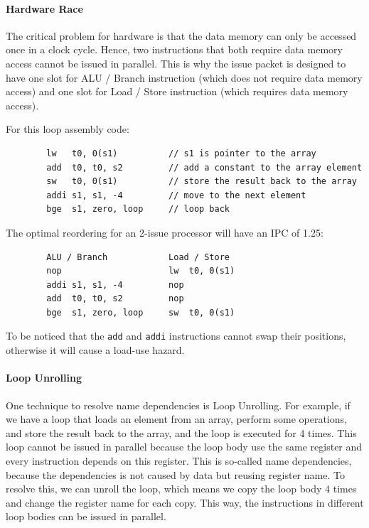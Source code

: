 \documentclass[a4paper,12pt]{article}
\begin{document}
\paragraph{Hardware Race} The critical problem for hardware is that the data memory can only be accessed once in a clock cycle. Hence, two instructions that both require data memory access cannot be issued in parallel. This is why the issue packet is designed to have one slot for ALU / Branch instruction (which does not require data memory access) and one slot for Load / Store instruction (which requires data memory access).  

\begin{examplebox}
	For this loop assembly code:
	\begin{verbatim}
		lw   t0, 0(s1)          // s1 is pointer to the array
		add  t0, t0, s2         // add a constant to the array element
		sw   t0, 0(s1)          // store the result back to the array
		addi s1, s1, -4         // move to the next element
		bge  s1, zero, loop     // loop back
	\end{verbatim}
	The optimal reordering for an 2-issue processor will have an IPC of 1.25:
	\begin{verbatim}
		ALU / Branch            Load / Store
		nop                     lw  t0, 0(s1)
		addi s1, s1, -4         nop
		add  t0, t0, s2         nop
		bge  s1, zero, loop     sw  t0, 0(s1)
	\end{verbatim}
	To be noticed that the \texttt{add} and \texttt{addi} instructions cannot swap their positions, otherwise it will cause a load-use hazard.
\end{examplebox}

\paragraph{Loop Unrolling} One technique to resolve name dependencies is Loop Unrolling. For example, if we have a loop that loads an element from an array, perform some operations, and store the result back to the array, and the loop is executed for 4 times. This loop cannot be issued in parallel because the loop body use the same register and every instruction depends on this register. This is so-called name dependencies, because the dependencies is not caused by data but reusing register name. To resolve this, we can unroll the loop, which means we copy the loop body 4 times and change the register name for each copy. This way, the instructions in different loop bodies can be issued in parallel.
\end{document}

